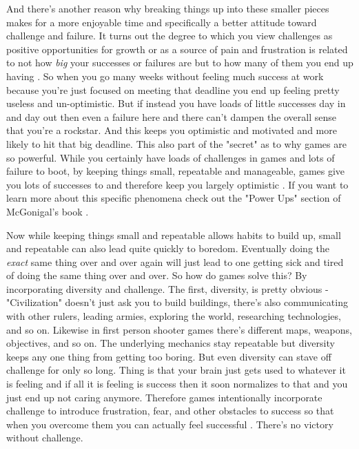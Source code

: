 \documentclass[11pt]{book}
\begin{document}
And there's another reason why breaking things up into these smaller pieces makes for a more enjoyable time and specifically a better attitude toward challenge and failure. It turns out the degree to which you view challenges as positive opportunities for growth or as a source of pain and frustration is related to not how \textit{big} your successes or failures are but to how many of them you end up having \cite{superbetter}. So when you go many weeks without feeling much success at work because you're just focused on meeting that deadline you end up feeling pretty useless and un-optimistic. But if instead you have loads of little successes day in and day out then even a failure here and there can't dampen the overall sense that you're a rockstar. And this keeps you optimistic and motivated and more likely to hit that big deadline. This also part of the "secret" as to why games are so powerful. While you certainly have loads of challenges in games and lots of failure to boot, by keeping things small, repeatable and manageable, games give you lots of successes to and therefore keep you largely optimistic \cite{superbetter}. If you want to learn more about this specific phenomena check out the "Power Ups" section of McGonigal's book \cite{superbetter}. 
\newline

Now while keeping things small and repeatable allows habits to build up, small and repeatable can also lead quite quickly to boredom. Eventually doing the \textit{exact} same thing over and over again will just lead to one getting sick and tired of doing the same thing over and over. So how do games solve this? By incorporating diversity and challenge. The first, diversity, is pretty obvious - "Civilization" doesn't just ask you to build buildings, there's also communicating with other rulers, leading armies, exploring the world, researching technologies, and so on. Likewise in first person shooter games there's different maps, weapons, objectives, and so on. The underlying mechanics stay repeatable but diversity keeps any one thing from getting too boring. But even diversity can stave off challenge for only so long. Thing is that your brain just gets used to whatever it is feeling and if all it is feeling is success then it soon normalizes to that and you just end up not caring anymore. Therefore games intentionally incorporate challenge to introduce frustration, fear, and other obstacles to success so that when you overcome them you can actually feel successful \cite{superbetter}. There's no victory without challenge. 
\newline
\end{document}
